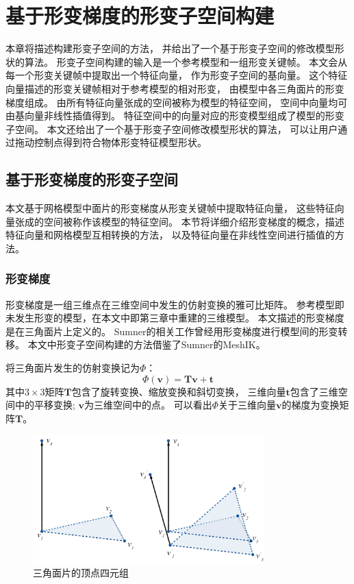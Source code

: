 \chapter{基于形变梯度的形变子空间构建}
本章将描述构建形变子空间的方法，
并给出了一个基于形变子空间的修改模型形状的算法。
形变子空间构建的输入是一个参考模型和一组形变关键帧。
本文会从每一个形变关键帧中提取出一个特征向量，
作为形变子空间的基向量。
这个特征向量描述的形变关键帧相对于参考模型的相对形变，
由模型中各三角面片的形变梯度组成。
由所有特征向量张成的空间被称为模型的特征空间，
空间中向量均可由基向量非线性插值得到。
特征空间中的向量对应的形变模型组成了模型的形变子空间。
本文还给出了一个基于形变子空间修改模型形状的算法，
可以让用户通过拖动控制点得到符合物体形变特征模型形状。
\section{基于形变梯度的形变子空间}
本文基于网格模型中面片的形变梯度从形变关键帧中提取特征向量，
这些特征向量张成的空间被称作该模型的特征空间。
本节将详细介绍形变梯度的概念，描述特征向量和网格模型互相转换的方法，
以及特征向量在非线性空间进行插值的方法。
\subsection{形变梯度}
形变梯度是一组三维点在三维空间中发生的仿射变换的雅可比矩阵。
参考模型即未发生形变的模型，在本文中即第三章中重建的三维模型。
本文描述的形变梯度是在三角面片上定义的。
Sumner的相关工作\cite{sumner2004deformation}曾经用形变梯度进行模型间的形变转移。
本文中形变子空间构建的方法借鉴了Sumner的MeshIK\cite{sumner2005mesh}。

将三角面片发生的仿射变换记为$\Phi$：
\begin{equation}
    \label{eq_at}
    \Phi(\bm{v})=\bm{T}\bm{v}+\bm{t}
\end{equation}
其中$3 \times 3$矩阵$\bm{T}$包含了旋转变换、缩放变换和斜切变换，
三维向量$\bm{t}$包含了三维空间中的平移变换;
$\bm{v}$为三维空间中的点。
可以看出$\Phi$关于三维向量$\bm{v}$的梯度为变换矩阵$\bm{T}$。
\begin{figure}
    \centering
    \includegraphics[width = 0.8\textwidth]{./Pictures/DefGra.png}
    \caption{三角面片的顶点四元组}
    \label{deformation_gradient}
\end{figure}

